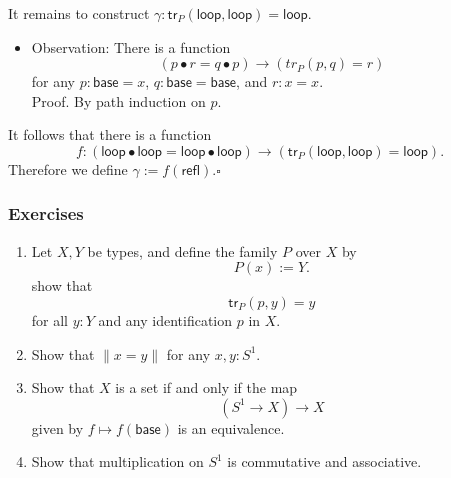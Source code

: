 \documentclass[handout]{beamer}
\newcommand{\brck}[1]{\|#1\|}
\newcommand{\sphere}[1]{S^{#1}}
\newcommand{\refl}{\mathsf{refl}}
\newcommand{\baseS}{\mathsf{base}}
\newcommand{\loopS}{\mathsf{loop}}
\newcommand{\tr}{\mathsf{tr}}
\newcommand{\apply}[2]{#1(#2)}
\begin{document}
\begin{frame}
  It remains to construct $\gamma:\apply{\tr_P}{\loopS,\loopS}=\loopS$.
  \begin{itemize}
  \item Observation: There is a function
    \begin{equation*}
      (p\bullet r = q \bullet p) \to (\apply{tr_P}{p,q}=r)
    \end{equation*}
    for any $p:\baseS=x$, $q:\baseS=\baseS$, and $r:x=x$. \\[1em]

    Proof. By path induction on $p$. 
  \end{itemize}\pause
  It follows that there is a function
  \begin{equation*}
    f:(\loopS\bullet\loopS = \loopS\bullet\loopS)\to (\apply{\tr_P}{\loopS,\loopS}=\loopS).
  \end{equation*}
  Therefore we define $\gamma:=\apply{f}{\refl}$.\hfill$\square$
\end{frame}

\begin{frame}
  \frametitle{Exercises}
  \begin{enumerate}
  \item Let $X,Y$ be types, and define the family $P$ over $X$ by
    \begin{equation*}
      \apply{P}{x}:=Y.
    \end{equation*}
    show that
    \begin{equation*}
      \apply{\tr_P}{p,y}=y
    \end{equation*}
    for all $y:Y$ and any identification $p$ in $X$.
  \item Show that $\brck{x=y}$ for any $x,y:\sphere{1}$.
  \item Show that $X$ is a set if and only if the map
    \begin{equation*}
      (\sphere{1}\to X)\to X
    \end{equation*}
    given by $f\mapsto \apply{f}{\baseS}$ is an equivalence.
  \item Show that multiplication on $\sphere{1}$ is commutative and associative.
  \end{enumerate}
\end{frame}
\end{document}
